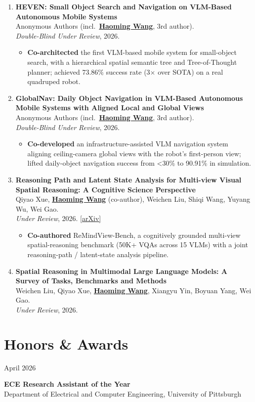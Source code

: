 \documentclass[11pt, letterpaper]{article}
\newenvironment{datedentry}[1]{%
  \par\noindent
  \begin{minipage}[t]{2.8cm}\raggedright\small #1\end{minipage}%
  \hspace{0.3cm}%
  \begin{minipage}[t]{\dimexpr\linewidth-3.1cm\relax}\raggedright
}{%
  \end{minipage}\par\medskip
}
\newenvironment{publist}{
  \begin{enumerate}[leftmargin=1.7em, itemsep=4pt, parsep=0pt, topsep=2pt, label=\arabic*.]
}{
  \end{enumerate}
}
\newcommand{\impactbullet}[1]{%
  \par\vspace{1pt}%
  \begin{itemize}[leftmargin=1.2em, topsep=0pt, itemsep=0pt, parsep=0pt, partopsep=0pt]
    \item #1
  \end{itemize}%
}
\newcommand{\me}{\underline{\textbf{Haoming Wang}}}
\newcommand{\meco}{\underline{\textbf{Haoming Wang}} (co-author)}
\newcommand{\meanon}{\underline{\textbf{Haoming Wang}}}
\begin{document}
\begin{publist}
\item \textbf{HEVEN: Small Object Search and Navigation on VLM-Based Autonomous Mobile Systems}\\
Anonymous Authors (incl.\ \meanon, 3rd author).\\
\textit{Double-Blind Under Review}, 2026.
\impactbullet{\textbf{Co-architected} the first VLM-based mobile system for small-object search, with a hierarchical spatial semantic tree and Tree-of-Thought planner; achieved 73.86\% success rate (3$\times$ over SOTA) on a real quadruped robot.}

\item \textbf{GlobalNav: Daily Object Navigation in VLM-Based Autonomous Mobile Systems with Aligned Local and Global Views}\\
Anonymous Authors (incl.\ \meanon, 3rd author).\\
\textit{Double-Blind Under Review}, 2026.
\impactbullet{\textbf{Co-developed} an infrastructure-assisted VLM navigation system aligning ceiling-camera global views with the robot's first-person view; lifted daily-object navigation success from <30\% to 90.91\% in simulation.}

\item \textbf{Reasoning Path and Latent State Analysis for Multi-view Visual Spatial Reasoning: A Cognitive Science Perspective}\\
Qiyao Xue, \meco, Weichen Liu, Shiqi Wang, Yuyang Wu, Wei Gao.\\
\textit{Under Review}, 2026. \href{https://arxiv.org/abs/2512.02340}{[arXiv]}
\impactbullet{\textbf{Co-authored} ReMindView-Bench, a cognitively grounded multi-view spatial-reasoning benchmark (50K+ VQAs across 15 VLMs) with a joint reasoning-path / latent-state analysis pipeline.}

\item \textbf{Spatial Reasoning in Multimodal Large Language Models: A Survey of Tasks, Benchmarks and Methods}\\
Weichen Liu, Qiyao Xue, \me, Xiangyu Yin, Boyuan Yang, Wei Gao.\\
\textit{Under Review}, 2026.
\end{publist}

\section{Honors \& Awards}

\begin{datedentry}{April 2026}
\textbf{ECE Research Assistant of the Year}\\
Department of Electrical and Computer Engineering, University of Pittsburgh
\end{datedentry}
\end{document}
